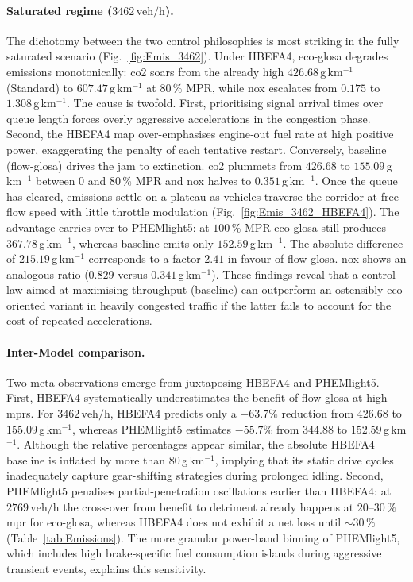 \paragraph{Saturated regime ($3462\,\mathrm{veh/h}$).}
The dichotomy between the two control philosophies is most striking in the fully saturated scenario (Fig.~\ref{fig:Emis_3462}). Under HBEFA4, \ac{eco-glosa} degrades emissions monotonically: \ac{co2} soars from the already high $426.68$\,g\,km$^{-1}$ (Standard) to $607.47$\,g\,km$^{-1}$ at $80\,\%$ MPR, while \ac{nox} escalates from $0.175$ to $1.308$\,g\,km$^{-1}$. The cause is twofold. First, prioritising signal arrival times over queue length forces overly aggressive accelerations in the congestion phase. Second, the HBEFA4 map over-emphasises engine‐out fuel rate at high positive power, exaggerating the penalty of each tentative restart.
\mynewline
Conversely, baseline (\ac{flow-glosa}) drives the jam to extinction. \ac{co2} plummets from $426.68$ to $155.09$\,g\,km$^{-1}$ between $0$ and $80\,\%$ MPR and \ac{nox} halves to $0.351$\,g\,km$^{-1}$. Once the queue has cleared, emissions settle on a plateau as vehicles traverse the corridor at free‐flow speed with little throttle modulation (Fig.~\ref{fig:Emis_3462_HBEFA4}). The advantage carries over to PHEMlight5: at $100\,\%$ MPR \ac{eco-glosa} still produces $367.78$\,g\,km$^{-1}$, whereas baseline emits only $152.59$\,g\,km$^{-1}$. The absolute difference of $215.19$\,g\,km$^{-1}$ corresponds to a factor $2.41$ in favour of \ac{flow-glosa}. \ac{nox} shows an analogous ratio ($0.829$ versus $0.341$\,g\,km$^{-1}$). These findings reveal that a control law aimed at maximising throughput (baseline) can outperform an ostensibly eco-oriented variant in heavily congested traffic if the latter fails to account for the cost of repeated accelerations.

\paragraph{Inter-Model comparison.}
Two meta-observations emerge from juxtaposing HBEFA4 and PHEMlight5. First, HBEFA4 systematically underestimates the benefit of \ac{flow-glosa} at high \acp{mpr}. For \mbox{$3462\,\mathrm{veh/h}$}, HBEFA4 predicts only a ${-63.7\%}$ reduction from $426.68$ to $155.09$\,g\,km$^{-1}$, whereas PHEMlight5 estimates ${-55.7\%}$ from $344.88$ to $152.59$\,g\,km$^{-1}$. Although the relative percentages appear similar, the absolute HBEFA4 baseline is inflated by more than $80$\,g\,km$^{-1}$, implying that its static drive cycles inadequately capture gear-shifting strategies during prolonged idling. Second, PHEMlight5 penalises partial‐penetration oscillations earlier than HBEFA4: at $2769\,\mathrm{veh/h}$ the cross-over from benefit to detriment already happens at $20$--$30\,\%$ \ac{mpr} for \ac{eco-glosa}, whereas HBEFA4 does not exhibit a net loss until ${\sim}30\,\%$ (Table~\ref{tab:Emissions}). The more granular power-band binning of PHEMlight5, which includes high brake‐specific fuel consumption islands during aggressive transient events, explains this sensitivity.


